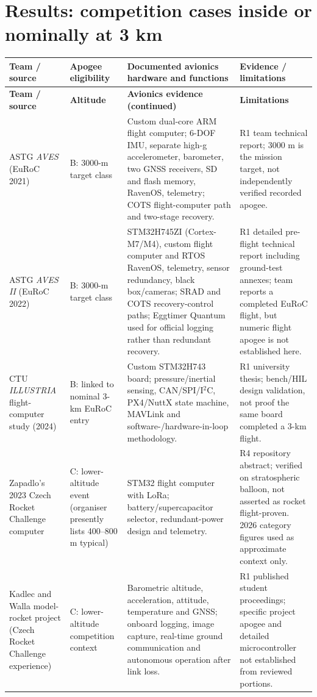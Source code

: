 \documentclass[10pt,a4paper]{article}
\begin{document}
\section{Results: competition cases inside or nominally at 3 km}
\small
\begin{longtable}{@{}L{30mm}L{22mm}L{51mm}L{39mm}@{}}
\toprule{}\textbf{Team / source} & \textbf{Apogee eligibility} & \textbf{Documented avionics hardware and functions} & \textbf{Evidence / limitations}\\\midrule\endfirsthead
\toprule{}\textbf{Team / source} & \textbf{Altitude} & \textbf{Avionics evidence (continued)} & \textbf{Limitations}\\\midrule\endhead
\bottomrule\endlastfoot
ASTG \emph{AVES} (EuRoC 2021) \cite{astg2021aves} & B: 3000-m target class & Custom dual-core ARM flight computer; 6-DOF IMU, separate high-g accelerometer, barometer, two GNSS receivers, SD and flash memory, RavenOS, telemetry; COTS flight-computer path and two-stage recovery. & R1 team technical report; 3000 m is the mission target, not independently verified recorded apogee.\\
ASTG \emph{AVES II} (EuRoC 2022) \cite{astg2022aves2} & B: 3000-m target class & STM32H745ZI (Cortex-M7/M4), custom flight computer and RTOS RavenOS, telemetry, sensor redundancy, black box/cameras; SRAD and COTS recovery-control paths; Eggtimer Quantum used for official logging rather than redundant recovery. & R1 detailed pre-flight technical report including ground-test annexes; team reports a completed EuRoC flight, but numeric flight apogee is not established here.\\
CTU \emph{ILLUSTRIA} flight-computer study (2024) \cite{zlamala2024} & B: linked to nominal 3-km EuRoC entry & Custom STM32H743 board; pressure/inertial sensing, CAN/SPI/I$^2$C, PX4/NuttX state machine, MAVLink and software-/hardware-in-loop methodology. & R1 university thesis; bench/HIL design validation, not proof the same board completed a 3-km flight.\\
Zapadlo's 2023 Czech Rocket Challenge computer \cite{zapadlo2023,czech2026} & C: lower-altitude event (organiser presently lists 400--800 m typical) & STM32 flight computer with LoRa; battery/supercapacitor selector, redundant-power design and telemetry. & R4 repository abstract; verified on stratospheric balloon, not asserted as rocket flight-proven. 2026 category figures used as approximate context only.\\
Kadlec and Walla model-rocket project (Czech Rocket Challenge experience) \cite{kadlec2024,czech2026} & C: lower-altitude competition context & Barometric altitude, acceleration, attitude, temperature and GNSS; onboard logging, image capture, real-time ground communication and autonomous operation after link loss. & R1 published student proceedings; specific project apogee and detailed microcontroller not established from reviewed portions.\\

\end{longtable}
\end{document}
